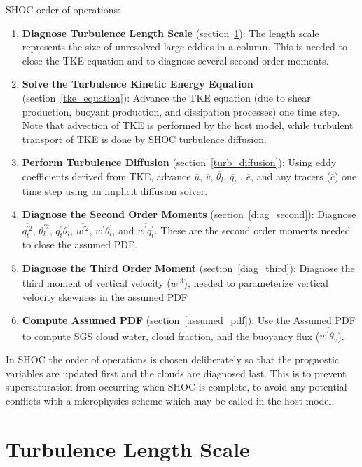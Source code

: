 \documentclass[12pt,titlepage]{article}
\numberwithin{equation}{section}
\begin{document}
SHOC order of operations:
\begin{enumerate}
  \item \textbf{Diagnose Turbulence Length Scale} (section~\ref{turb_scale}): The length scale represents the size of unresolved large eddies in a column.  This is needed to close the TKE equation and to diagnose several second order moments.
  \item \textbf{Solve the Turbulence Kinetic Energy Equation} (section~\ref{tke_equation}): Advance the TKE equation (due to shear production, buoyant production, and dissipation processes) one time step.  Note that advection of TKE is performed by the host model, while turbulent transport of TKE is done by SHOC turbulence diffusion.    
  \item \textbf{Perform Turbulence Diffusion} (section~\ref{turb_diffusion}): Using eddy coefficients derived from TKE, advance $\overline{u}$, $\overline{v}$, $\overline{\theta_{l}}$, $\overline{q_{t}}$ , $\overline{e}$, and any tracers ($\overline{c}$) one time step using an implicit diffusion solver.  
  \item \textbf{Diagnose the Second Order Moments} (section~\ref{diag_second}): Diagnose $\overline{q_{t}^{'2}}$, $\overline{\theta_{l}^{'2}}$, $\overline{q_{t}^{'}\theta_{l}^{'}}$, $\overline{w^{'2}}$, $\overline{w^{'}\theta_{l}^{'}}$, and $\overline{w^{'}q_{t}^{'}}$.  These are the second order moments needed to close the assumed PDF.
  \item \textbf{Diagnose the Third Order Moment} (section~\ref{diag_third}):  Diagnose the third moment of vertical velocity ($\overline{w^{'3}}$), needed to parameterize vertical velocity skewness in the assumed PDF
  \item \textbf{Compute Assumed PDF} (section~\ref{assumed_pdf}): Use the Assumed PDF to compute SGS cloud water, cloud fraction, and the buoyancy flux ($\overline{w^{'}\theta_{v}^{'}}$).
\end{enumerate}

In SHOC the order of operations is chosen deliberately so that the prognostic variables are updated first and the clouds are diagnosed last.  This is to prevent supersaturation from occurring when SHOC is complete, to avoid any potential conflicts with a microphysics scheme which may be called in the host model. 

\section{Turbulence Length Scale}
\label{turb_scale}
\end{document}
